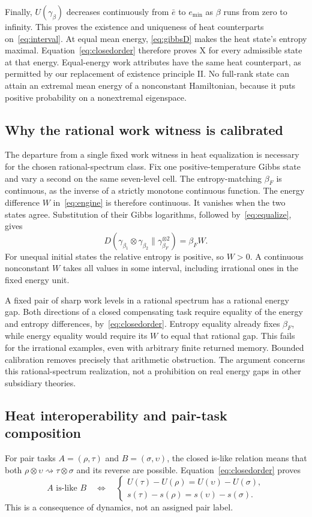 Finally, $U(\gamma_\beta)$ decreases continuously from $\bar e$ to $e_{\min}$ as $\beta$ runs from zero to infinity. This proves the existence and uniqueness of heat counterparts on~\eqref{eq:interval}. At equal mean energy, \eqref{eq:gibbsD} makes the heat state's entropy maximal. Equation~\eqref{eq:closedorder} therefore proves X for every admissible state at that energy. Equal-energy work attributes have the same heat counterpart, as permitted by our replacement of existence principle II. No full-rank state can attain an extremal mean energy of a nonconstant Hamiltonian, because it puts positive probability on a nonextremal eigenspace.

\subsection{Why the rational work witness is calibrated}\label{sec:rationalwitness}
The departure from a single fixed work witness in heat equalization is necessary for the chosen rational-spectrum class. Fix one positive-temperature Gibbs state and vary a second on the same seven-level cell. The entropy-matching $\beta_F$ is continuous, as the inverse of a strictly monotone continuous function. The energy difference $W$ in~\eqref{eq:engine} is therefore continuous. It vanishes when the two states agree. Substitution of their Gibbs logarithms, followed by~\eqref{eq:equalize}, gives
\[
 D(\gamma_{\beta_1}\otimes\gamma_{\beta_2}\|\gamma_{\beta_F}^{\otimes2})=\beta_FW.
\]
For unequal initial states the relative entropy is positive, so $W>0$. A continuous nonconstant $W$ takes all values in some interval, including irrational ones in the fixed energy unit.

A fixed pair of sharp work levels in a rational spectrum has a rational energy gap. Both directions of a closed compensating task require equality of the energy and entropy differences, by~\eqref{eq:closedorder}. Entropy equality already fixes $\beta_F$, while energy equality would require its $W$ to equal that rational gap. This fails for the irrational examples, even with arbitrary finite returned memory. Bounded calibration removes precisely that arithmetic obstruction. The argument concerns this rational-spectrum realization, not a prohibition on real energy gaps in other subsidiary theories.

\subsection{Heat interoperability and pair-task composition}
For pair tasks $A=(\rho,\tau)$ and $B=(\sigma,\upsilon)$, the closed is-like relation means that both $\rho\otimes\upsilon\rightsquigarrow\tau\otimes\sigma$ and its reverse are possible. Equation~\eqref{eq:closedorder} proves
\begin{equation}
 A\text{ is-like }B\quad\Longleftrightarrow\quad
 \begin{cases}
 U(\tau)-U(\rho)=U(\upsilon)-U(\sigma),\\
 s(\tau)-s(\rho)=s(\upsilon)-s(\sigma).
 \end{cases} \label{eq:islike}
\end{equation}
This is a consequence of dynamics, not an assigned pair label.

